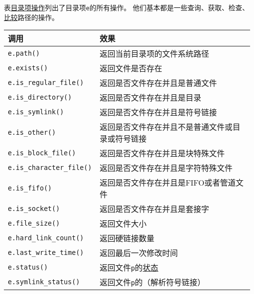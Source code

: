表\hyperref[t20.22]{目录项操作}列出了目录项\texttt{e}的所有操作。
他们基本都是一些查询、获取、检查、
\hyperref[ch20.3.6]{比较}路径的操作。
\begin{table}[ht]
    \centering
    \begin{tabular}{l|l}
        \hline
        \textbf{调用}                      & \textbf{效果}                               \\
        \hline
        \texttt{e.path()}                & 返回当前目录项的文件系统路径                            \\
        \texttt{e.exists()}              & 返回文件是否存在                                  \\
        \texttt{e.is\_regular\_file()}   & 返回是否文件存在并且是普通文件                           \\
        \texttt{e.is\_directory()}       & 返回是否文件存在并且是目录                             \\
        \texttt{e.is\_symlink()}         & 返回是否文件存在并且是符号链接                           \\
        \texttt{e.is\_other()}           & 返回是否文件存在并且不是普通文件或目录或符号链接                  \\
        \texttt{e.is\_block\_file()}     & 返回是否文件存在并且是块特殊文件                          \\
        \texttt{e.is\_character\_file()} & 返回是否文件存在并且是字符特殊文件                         \\
        \texttt{e.is\_fifo()}            & 返回是否文件存在并且是FIFO或者管道文件                     \\
        \texttt{e.is\_socket()}          & 返回是否文件存在并且是套接字                            \\
        \texttt{e.file\_size()}          & 返回文件大小                                    \\
        \texttt{e.hard\_link\_count()}   & 返回硬链接数量                                   \\
        \texttt{e.last\_write\_time()}   & 返回最后一次修改时间                                \\
        \texttt{e.status()}              & 返回文件\texttt{p}的\hyperref[ch20.4.2]{状态}    \\
        \texttt{e.symlink\_status()}     & 返回文件\texttt{p}的\nameref{ch20.4.2}（解析符号链接） \\

\end{tabular}
\end{table}
